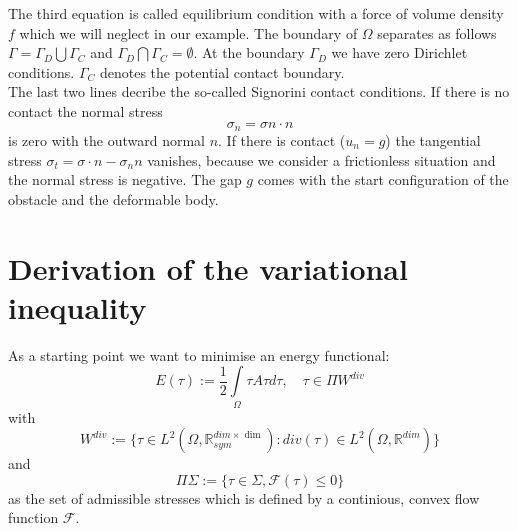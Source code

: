 \documentclass{article}
\begin{document}
The third equation is called equilibrium condition with a force of volume
density $f$ which we will neglect in our example.
The boundary of $\Omega$ separates as follows $\Gamma=\Gamma_D\bigcup\Gamma_C$ and $\Gamma_D\bigcap\Gamma_C=\emptyset$.
At the boundary $\Gamma_D$ we have zero Dirichlet conditions. $\Gamma_C$ denotes the potential contact boundary.\\
The last two lines decribe the so-called Signorini contact conditions. If there is no contact the normal  stress
$$ \sigma_n =  \sigma n\cdot n$$
is zero with the outward normal $n$. If there is contact ($u_n = g$) the tangential stress $\sigma_t = \sigma\cdot n - \sigma_n n$
vanishes, because we consider a frictionless situation and the normal stress is
negative. The gap $g$ comes with the start configuration of the obstacle and the
deformable body.

\section{Derivation of the variational inequality}

As a starting point we want to minimise an energy functional:
$$E(\tau) := \dfrac{1}{2}\int\limits_{\Omega}\tau A \tau d\tau,\quad \tau\in \Pi W^{div}$$
with
$$W^{div}:=\lbrace \tau\in
L^2(\Omega,\mathbb{R}^{dim\times\dim}_{sym}):div(\tau)\in L^2(\Omega,\mathbb{R}^{dim})\rbrace$$ and
$$\Pi \Sigma:=\lbrace \tau\in \Sigma, \mathcal{F}(\tau)\leq 0\rbrace$$
as the set of admissible stresses which is defined
by a continious, convex flow function $\mathcal{F}$.
\end{document}
